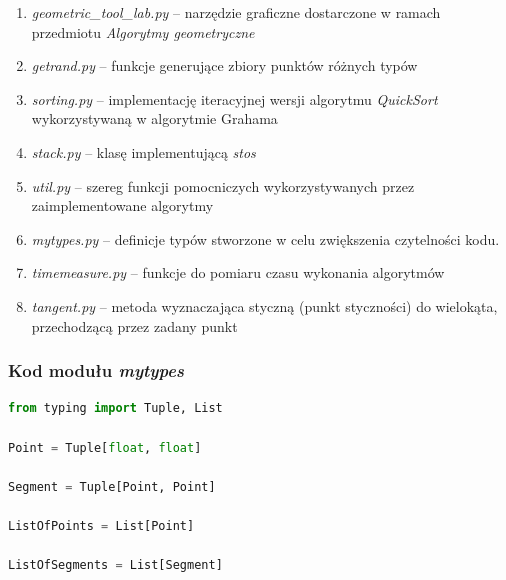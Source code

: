 \documentclass[11pt]{article}
\theoremstyle{remark} \newtheorem{definition}{def.}
\theoremstyle{definition} \newtheorem{twierdzenie}{tw.}
\begin{document}
\begin{enumerate}
    \item   \emph{geometric\_tool\_lab.py} -- narzędzie graficzne dostarczone w ramach przedmiotu \emph{Algorytmy geometryczne}
    \item   \emph{getrand.py} -- funkcje generujące zbiory punktów różnych typów 
    \item   \emph{sorting.py} -- implementację iteracyjnej wersji algorytmu \emph{QuickSort} wykorzystywaną w algorytmie Grahama
    \item   \emph{stack.py} -- klasę implementującą \emph{stos}
    \item   \emph{util.py} --  szereg funkcji pomocniczych wykorzystywanych przez zaimplementowane algorytmy
    \item   \emph{mytypes.py} --  definicje typów stworzone w celu zwiększenia czytelności kodu.
    \item   \emph{timemeasure.py} --  funkcje do pomiaru czasu wykonania algorytmów
    \item   \emph{tangent.py} -- metoda wyznaczająca styczną (punkt styczności) do wielokąta, przechodzącą przez zadany punkt
\end{enumerate}

\subsubsection*{Kod modułu \emph{mytypes}}
\begin{lstlisting}[language=Python]
from typing import Tuple, List

Point = Tuple[float, float]

Segment = Tuple[Point, Point]

ListOfPoints = List[Point] 

ListOfSegments = List[Segment]
\end{lstlisting}
\end{document}

